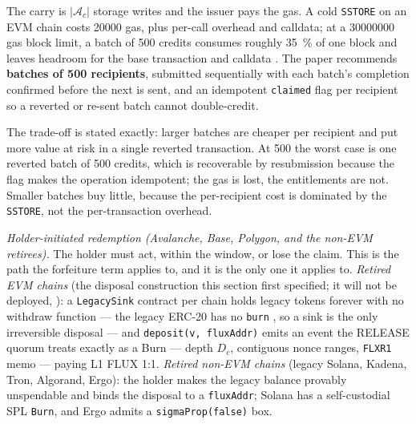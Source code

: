 \begin{remark}
\label{rem:batch-carry}
The carry is $|\mathcal{A}_c|$ storage writes and the issuer pays the gas. A cold \texttt{SSTORE} on
an EVM chain costs \num{20000} gas, plus per-call overhead and calldata; at a \num{30000000} gas
block limit, a batch of \num{500} credits consumes roughly \SI{35}{\percent} of one block and leaves
headroom for the base transaction and calldata \srcinferred. The paper recommends
\textbf{batches of \num{500} recipients}, submitted sequentially with each batch's completion
confirmed before the next is sent, and an idempotent \texttt{claimed} flag per recipient so a
reverted or re-sent batch cannot double-credit.

The trade-off is stated exactly: larger batches are cheaper per recipient and put more value at risk
in a single reverted transaction. At \num{500} the worst case is one reverted batch of \num{500}
credits, which is recoverable by resubmission because the flag makes the operation idempotent; the
gas is lost, the entitlements are not. Smaller batches buy little, because the per-recipient cost is
dominated by the \texttt{SSTORE}, not the per-transaction overhead.
\end{remark}

\smallskip
\noindent\emph{Holder-initiated redemption (Avalanche, Base, Polygon, and the non-EVM retirees).}
The holder must act, within the window, or lose the claim. This is the path the forfeiture term
applies to, and it is the only one it applies to. \emph{Retired EVM chains} (the disposal construction
this section first specified; it will not be deployed, ): a
\texttt{LegacySink} contract per chain holds legacy tokens forever with no withdraw function --- the
legacy ERC-20 has no \texttt{burn} , so a sink is the only
irreversible disposal --- and
\texttt{deposit(v, flux\allowbreak{}Addr)} emits an event the RELEASE quorum treats exactly as a Burn --- depth
$D_c$, contiguous nonce ranges, \texttt{FLXR1} memo --- paying L1 FLUX 1:1. \emph{Retired non-EVM
chains} (legacy Solana, Kadena, Tron, Algorand, Ergo): the holder makes the legacy balance provably
unspendable and binds the disposal to a \texttt{fluxAddr}; Solana has a self-custodial SPL
\texttt{Burn}, and Ergo admits a \texttt{sigma\allowbreak{}Prop(false)} box.

